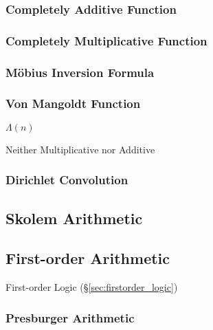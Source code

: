 \subsubsection{Completely Additive Function}
\label{sec:completely_additive_function}

\subsubsection{Completely Multiplicative Function}
\label{sec:completely_multiplicative_function}

\subsubsection{M\"obius Inversion Formula}
\label{sec:mobius_inversion}

\subsubsection{Von Mangoldt Function}\label{sec:vonmangoldt_function}

$\Lambda(n)$

Neither Multiplicative nor Additive



\subsubsection{Dirichlet Convolution}\label{sec:dirichlet_convolution}



\subsection{Skolem Arithmetic}\label{sec:skolem_arithmetic}
\cite{skolem23}

\subsection{First-order Arithmetic}\label{sec:firstorder_arithmetic}

First-order Logic (\S\ref{sec:firstorder_logic})



\subsubsection{Presburger Arithmetic}\label{sec:presburger_arithmetic}

